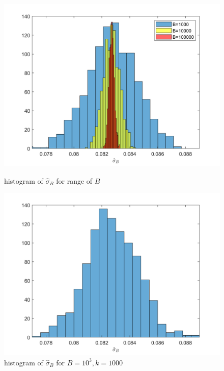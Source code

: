 \documentclass[10pt]{article}
\begin{document}
\begin{figure}[H]
    \begin{minipage}[b]{0.47\linewidth}
            \centering
            \includegraphics[width=\textwidth]{files/q3.png}
            \caption{histogram of $\hat{\sigma}_B$ for range of $B$}
        \end{minipage}
        \hfill
    \begin{minipage}[b]{0.47\linewidth}
            \centering
            \includegraphics[width=\textwidth]{files/q3,b=10^3.png}
            \caption{histogram of $\hat{\sigma}_B$ for $B=10^3,k=1000$}
        \end{minipage}
\end{figure}
\end{document}
